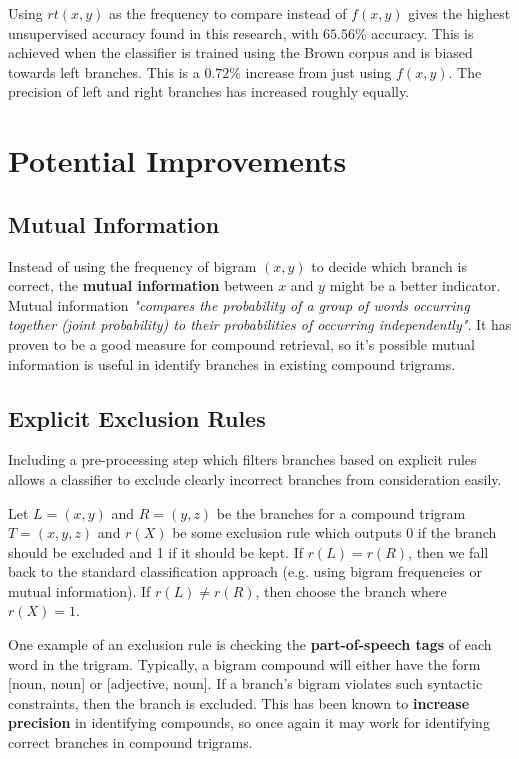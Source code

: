 \documentclass{article}
\begin{document}
Using $rt(x, y)$ as the frequency to compare instead of $f(x, y)$ gives the highest unsupervised accuracy found in this research, with $65.56\%$ accuracy. This is achieved when the classifier is trained using the Brown corpus and is biased towards left branches. This is a $0.72\%$ increase from just using $f(x, y)$. The precision of left and right branches has increased roughly equally.

\section{Potential Improvements}
\label{sec:improvements}

\subsection{Mutual Information}

Instead of using the frequency of bigram $(x, y)$ to decide which branch is correct, the \textbf{mutual information} between $x$ and $y$ might be a better indicator. Mutual information \textit{"compares the probability of a group of words occurring together (joint probability) to their probabilities of occurring independently"}\cite{wu-su-93}. It has proven to be a good measure for compound retrieval\cite{wu-su-93}, so it's possible mutual information is useful in identify branches in existing compound trigrams.

\subsection{Explicit Exclusion Rules}

Including a pre-processing step which filters branches based on explicit rules allows a classifier to exclude clearly incorrect branches from consideration easily. 

Let $L = (x, y)$ and $R = (y, z)$ be the branches for a compound trigram $T = (x, y, z)$ and $r(X)$ be some exclusion rule which outputs 0 if the branch should be excluded and 1 if it should be kept. If $r(L) = r(R)$, then we fall back to the standard classification approach (e.g. using bigram frequencies or mutual information). If $r(L) \neq r(R)$, then choose the branch where $r(X) = 1$.

One example of an exclusion rule is checking the \textbf{part-of-speech tags} of each word in the trigram. Typically, a bigram compound will either have the form [noun, noun] or [adjective, noun]. If a branch's bigram violates such syntactic constraints, then the branch is excluded.\cite{su-wu-chang-96} This has been known to \textbf{increase precision} in identifying compounds\cite{su-wu-chang-96}, so once again it may work for identifying correct branches in compound trigrams.
\end{document}
